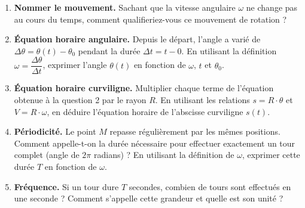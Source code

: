 \documentclass[11pt,a4paper]{article}
\newcommand{\kw}[1]{{\sffamily\bfseries\color{cBlue}#1}}
\begin{document}
\begin{questions}
\begin{enumerate}
  \item \kw{Nommer le mouvement.} Sachant que la vitesse angulaire $\omega$ ne change pas au cours du temps, comment qualifieriez-vous ce mouvement de rotation ?
  \item \kw{Équation horaire angulaire.} Depuis le départ, l’angle a varié de $\Delta\theta = \theta(t) - \theta_0$ pendant la durée $\Delta t = t - 0$. En utilisant la définition $\omega = \dfrac{\Delta\theta}{\Delta t}$, exprimer l’angle $\theta(t)$ en fonction de $\omega$, $t$ et $\theta_0$.
  \item \kw{Équation horaire curviligne.} Multiplier chaque terme de l’équation obtenue à la question 2 par le rayon $R$. En utilisant les relations $s = R\cdot\theta$ et $V = R\cdot\omega$, en déduire l’équation horaire de l’abscisse curviligne $s(t)$.
  \item \kw{Périodicité.} Le point $M$ repasse régulièrement par les mêmes positions. Comment appelle-t-on la durée nécessaire pour effectuer exactement un tour complet (angle de $2\pi$ radians) ? En utilisant la définition de $\omega$, exprimer cette durée $T$ en fonction de $\omega$.
  \item \kw{Fréquence.} Si un tour dure $T$ secondes, combien de tours sont effectués en une seconde ? Comment s’appelle cette grandeur et quelle est son unité ?
\end{enumerate}
\end{questions}
\end{document}
